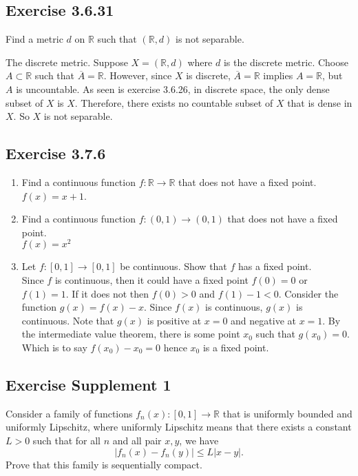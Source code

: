 \documentclass{tufte-book}
\theoremstyle{mytheoremstyle}
\theoremstyle{mylemstyle}
\theoremstyle{mydefstyle}
\begin{document}
\subsection{Exercise 3.6.31}
Find a metric $d$ on $\mathbb{R}$ such that $(\mathbb{R}, d)$ is not separable.

The discrete metric.  Suppose $X = (\mathbb{R}, d)$ where $d$ is the discrete metric.  Choose $A \subset \mathbb{R}$ such that $\overline{A}= \mathbb{R}$.  However, since $X$ is discrete,  $\overline{A}= \mathbb{R}$ implies $A = \mathbb{R}$, but $A$ is uncountable.  As seen is exercise 3.6.26, in discrete space, the only dense subset of $X$ is $X$. Therefore, there exists no countable subset of $X$ that is dense in $X$.  So $X$ is not separable.

\subsection{Exercise 3.7.6}
\begin{enumerate}
\item Find a continuous function $f: \mathbb{R} \to \mathbb{R}$ that does not have a fixed point.\\
$f(x) = x+1$.

\item Find a continuous function $f:(0,1) \to (0,1)$ that does not have a fixed point.\\
$f(x) = x^2$

\item Let $f:[0,1] \to [0,1]$ be continuous.  Show that $f$ has a fixed point.\\

Since $f$ is continuous, then it could have a fixed point $f(0) = 0$ or $f(1) = 1$.  If it does not then $f(0) > 0$ and $f(1)-1 < 0$.  Consider the function $g(x) = f(x) - x$.  Since $f(x)$ is continuous, $g(x)$ is continuous.  Note that $g(x)$ is positive at $x = 0$ and negative at $x  =1$.  By the intermediate value theorem, there is some point $x_0$ such that $g(x_0) = 0$.  Which is to say $f(x_0) - x_0 = 0$ hence $x_0$ is a fixed point.
\end{enumerate}

\subsection{Exercise Supplement 1}
Consider a family of functions $f_n(x): [0,1] \to \mathbb{R}$ that is uniformly bounded and uniformly Lipschitz, where uniformly Lipschitz means that there exists a constant $L>0$ such that for all $n$ and all pair $x,y$, we have
\[|f_n(x) - f_n(y)| \leq L|x-y|. \]
Prove that this family is sequentially compact.  
\end{document}
